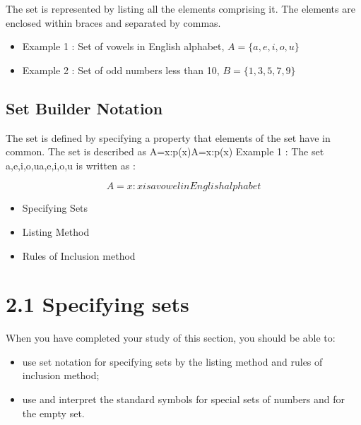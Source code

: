 \documentclass[12pt]{article}
\begin{document}

\newpage
The set is represented by listing all the elements comprising it. The elements are enclosed within braces and separated by commas.

\begin{itemize}
\item Example 1 : Set of vowels in English alphabet, $A=\{a,e,i,o,u\}$
\item Example 2 : Set of odd numbers less than 10, $B=\{1,3,5,7,9\}$
\end{itemize}
\subsection{Set Builder Notation}
The set is defined by specifying a property that elements of the set have in common. The set is described as A={x:p(x)}A={x:p(x)}
Example 1 : The set {a,e,i,o,u}{a,e,i,o,u} is written as :

\[A={x:x is a vowel in English alphabet}\]


\begin{itemize}
\item Specifying Sets
\item Listing Method
\item Rules of Inclusion method
\end{itemize}
\section{2.1 Specifying sets}
\smallskip 
When you have completed your study of this section, you should be able to:
\begin{itemize}
\item use set notation for specifying sets by the listing method and rules of inclusion method;
\item use and interpret the standard symbols for special sets of numbers and for the empty set.
\end{itemize}
\end{document}

